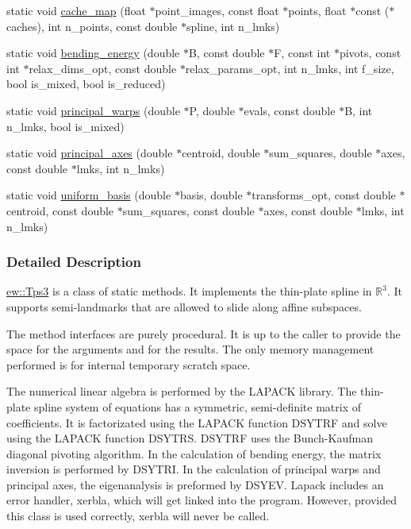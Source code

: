 \begin{DoxyCompactItemize}
static void \hyperlink{classew_1_1Tps3_a0ba8dc750773d749e97459f565bb3fda}{cache\_\-map} (float $\ast$point\_\-images, const float $\ast$points, float $\ast$const ($\ast$caches), int n\_\-points, const double $\ast$spline, int n\_\-lmks)
\item 
static void \hyperlink{classew_1_1Tps3_a25e1d6b86c7ff8fe5a2a04151e636082}{bending\_\-energy} (double $\ast$B, const double $\ast$F, const int $\ast$pivots, const int $\ast$relax\_\-dims\_\-opt, const double $\ast$relax\_\-params\_\-opt, int n\_\-lmks, int f\_\-size, bool is\_\-mixed, bool is\_\-reduced)
\item 
static void \hyperlink{classew_1_1Tps3_a72705ad5c3eb18ad424598840dd4e2c2}{principal\_\-warps} (double $\ast$P, double $\ast$evals, const double $\ast$B, int n\_\-lmks, bool is\_\-mixed)
\item 
static void \hyperlink{classew_1_1Tps3_a02aeaf33e23f589c11ac000452a76775}{principal\_\-axes} (double $\ast$centroid, double $\ast$sum\_\-squares, double $\ast$axes, const double $\ast$lmks, int n\_\-lmks)
\item 
static void \hyperlink{classew_1_1Tps3_a7387ee3274c7c6ba83c499b809506863}{uniform\_\-basis} (double $\ast$basis, double $\ast$transforms\_\-opt, const double $\ast$centroid, const double $\ast$sum\_\-squares, const double $\ast$axes, const double $\ast$lmks, int n\_\-lmks)
\end{DoxyCompactItemize}


\subsubsection{Detailed Description}
\hyperlink{classew_1_1Tps3}{ew::Tps3} is a class of static methods. It implements the thin-\/plate spline in $\mathbb{R}^3$. It supports semi-\/landmarks that are allowed to slide along affine subspaces.

The method interfaces are purely procedural. It is up to the caller to provide the space for the arguments and for the results. The only memory management performed is for internal temporary scratch space.

The numerical linear algebra is performed by the LAPACK library. The thin-\/plate spline system of equations has a symmetric, semi-\/definite matrix of coefficients. It is factorizated using the LAPACK function {\ttfamily DSYTRF} and solve using the LAPACK function {\ttfamily DSYTRS}. {\ttfamily DSYTRF} uses the Bunch-\/Kaufman diagonal pivoting algorithm. In the calculation of bending energy, the matrix inversion is performed by {\ttfamily DSYTRI}. In the calculation of principal warps and principal axes, the eigenanalysis is preformed by {\ttfamily DSYEV}. Lapack includes an error handler, {\ttfamily xerbla}, which will get linked into the program. However, provided this class is used correctly, {\ttfamily xerbla} will never be called.

